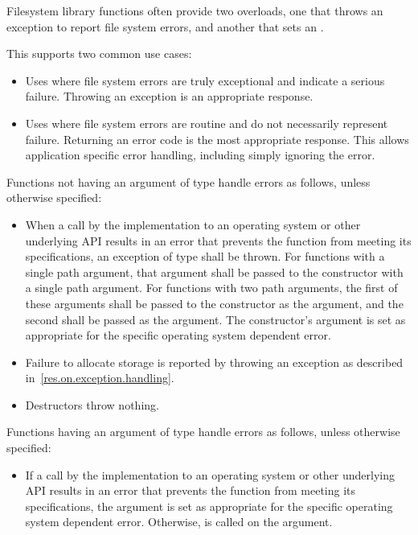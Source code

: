 \pnum
Filesystem library functions often provide two overloads, one that
throws an exception to report file system errors, and another that sets an .
\begin{note} This supports two common use cases:
\begin{itemize}
\item
Uses where file system errors are truly exceptional
and indicate a serious failure.
Throwing an exception is an appropriate response.
\item
Uses where file system errors are routine
and do not necessarily represent failure.
Returning an error code is the most appropriate response.
This allows application specific error handling, including simply ignoring the error.
\end{itemize}
\end{note}

\pnum
Functions not having an argument of type 
handle errors as follows, unless otherwise specified:
\begin{itemize}
\item When a call by the
  implementation to an operating system or other underlying API results in an
  error that prevents the function from meeting its specifications, an exception
  of type
 shall be thrown. For functions with a single path
  argument, that argument shall be passed to the
 constructor with a single path argument. For
  functions with two path arguments, the first of these arguments shall be
  passed to the
 constructor as the  argument,
  and the second shall be passed as the  argument. The
   constructor's  argument
  is set as appropriate for the specific operating system dependent error.
\item Failure to allocate storage is reported by throwing an exception
as described in~\ref{res.on.exception.handling}.
\item Destructors throw nothing.
\end{itemize}

\pnum
Functions having an argument of type 
handle errors as follows, unless otherwise specified:
\begin{itemize}
\item If a call by the
  implementation to an operating system or other underlying API results in an
  error that prevents the function from meeting its specifications, the
   argument is set as
  appropriate for the specific operating system dependent error. Otherwise, 
  is called on the
   argument.
\end{itemize}


